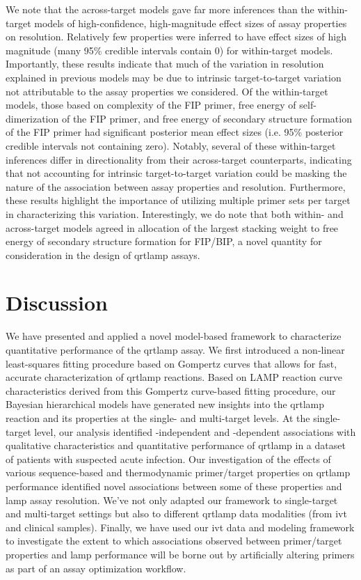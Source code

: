 \documentclass[../thesis.tex]{subfiles}
\begin{document}
We note that the across-target models gave far more inferences than the within-target models of high-confidence, high-magnitude effect sizes of assay properties on resolution. Relatively few properties were inferred to have effect sizes of high magnitude (many 95\% credible intervals contain 0) for within-target models. Importantly, these results indicate that much of the variation in resolution explained in previous models may be due to intrinsic target-to-target variation not attributable to the assay properties we considered. Of the within-target models, those based on complexity of the FIP primer, free energy of self-dimerization of the FIP primer, and free energy of secondary structure formation of the FIP primer had significant posterior mean effect sizes (i.e. 95\% posterior credible intervals not containing zero). Notably, several of these within-target inferences differ in directionality from their across-target counterparts, indicating that not accounting for intrinsic target-to-target variation could be masking the nature of the association between assay properties and resolution. Furthermore, these results highlight the importance of utilizing multiple primer sets per target in characterizing this variation. Interestingly, we do note that both within- and across-target models agreed in allocation of the largest stacking weight to free energy of secondary structure formation for FIP/BIP, a novel quantity for consideration in the design of \gls{qrtlamp} assays.


\section{Discussion \label{sec:discussion}}
We have presented and applied a novel model-based framework to characterize quantitative performance of the \gls{qrtlamp} assay. We first introduced a non-linear least-squares fitting procedure based on Gompertz curves that allows for fast, accurate characterization of \gls{qrtlamp} reactions. Based on LAMP reaction curve characteristics derived from this Gompertz curve-based fitting procedure, our Bayesian hierarchical models  have generated new insights into the \gls{qrtlamp} reaction and its properties at the single- and multi-target levels. At the single-target level, our analysis identified -independent and -dependent associations with qualitative characteristics and quantitative performance of \gls{qrtlamp} in a dataset of patients with suspected acute infection. Our investigation of the effects of various sequence-based and thermodynamic primer/target properties on \gls{qrtlamp} performance identified novel associations between some of these properties and \gls{lamp} assay resolution. We've not only adapted our framework to single-target and multi-target settings but also to different \gls{qrtlamp} data modalities (from \gls{ivt}  and clinical samples). Finally, we have used our \gls{ivt}  data and modeling framework to investigate the extent to which associations observed between primer/target properties and \gls{lamp} performance will be borne out by artificially altering primers as part of an assay optimization workflow. 
\end{document}
